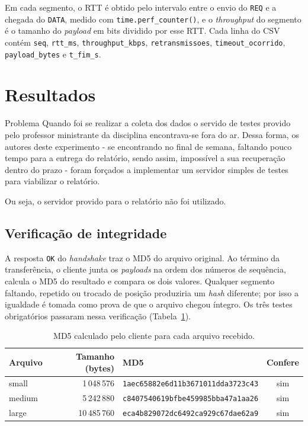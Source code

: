 \documentclass[11pt,a4paper]{article}
\begin{document}
Em cada segmento, o RTT é obtido pelo intervalo entre o envio do \texttt{REQ} e a
chegada do \texttt{DATA}, medido com \texttt{time.perf\_counter()}, e o
\textit{throughput} do segmento é o tamanho do \textit{payload} em bits dividido por esse
RTT. Cada linha do CSV contém \texttt{seq}, \texttt{rtt\_ms}, \texttt{throughput\_kbps},
\texttt{retransmissoes}, \texttt{timeout\_ocorrido}, \texttt{payload\_bytes} e
\texttt{t\_fim\_s}.

\section{Resultados}

\begin{nota}{Problema}
	Quando foi se realizar a coleta dos dados o servido de testes provido pelo professor ministrante da disciplina encontrava-se fora do ar.
	Dessa forma, os autores deste experimento - se encontrando no final de semana, faltando pouco tempo para a entrega do relatório, sendo assim, impossível a sua recuperação dentro do prazo -
	foram forçados a implementar um servidor simples de testes para viabilizar o relatório.

	Ou seja, o servidor provido para o relatório não foi utilizado.

\end{nota}

\subsection{Verificação de integridade}

A resposta \texttt{OK} do \textit{handshake} traz o MD5 do arquivo original. Ao término
da transferência, o cliente junta os \textit{payloads} na ordem dos números de
sequência, calcula o MD5 do resultado e compara os dois valores. Qualquer segmento
faltando, repetido ou trocado de posição produziria um \textit{hash} diferente; por isso
a igualdade é tomada como prova de que o arquivo chegou íntegro. Os três testes
obrigatórios passaram nessa verificação (Tabela~\ref{tab:md5}).

\begin{table}[H]
\centering
\caption{MD5 calculado pelo cliente para cada arquivo recebido.}
\label{tab:md5}
\small
\begin{tabular}{@{}lrlc@{}}
\toprule
\textbf{Arquivo} & \textbf{Tamanho (bytes)} & \textbf{MD5} & \textbf{Confere} \\
\midrule
small  & 1\,048\,576  & \texttt{1aec65882e6d11b3671011dda3723c43} & sim \\
medium & 5\,242\,880  & \texttt{c8407540619bfbe459985bba47a1aa26} & sim \\
large  & 10\,485\,760 & \texttt{eca4b829072dc6492ca929c67dae62a9} & sim \\
\bottomrule
\end{tabular}
\end{table}
\end{document}
